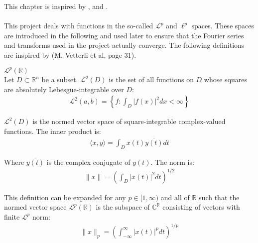 This chapter is inspired by \cite{FAA}, \cite{FSP} and \cite{FTFA}.
\\ \\
This project deals with functions in the so-called $\mathcal{L}^p$ and $\ell^p$ spaces. These spaces are introduced in the following and used later to ensure that the Fourier series and transforms used in the project actually converge. The following definitions are inspired by (M. Vetterli et al, page 31).

\begin{definition}{$\mathcal{L}^p(\mathbb{R})$}
\\
Let $D \subset \mathbb{R}^n$ be a subset. $\mathcal{L}^2(D)$ is the set of all functions on $D$ whose squares are absolutely Lebesgue-integrable over $D$:
\begin{align*}
\mathcal{L}^2(a,b) = \left\{ f: \int_D |f(x)|^2 dx < \infty \right\}
\end{align*}

$\mathcal{L}^2(D)$ is the normed vector space of square-integrable complex-valued functions. The inner product is:
\begin{align*}
\langle x,y \rangle =  \int_D x(t) \overline{y(t)} dt
\end{align*}

Where $\overline{y(t)}$ is the complex conjugate of $y(t)$. The norm is:
\begin{align*}
\|x\| = \left( \int_D |x(t)|^2 dt \right)^{1/2}
\end{align*}

This definition can be expanded for any $p \in [1,\infty)$ and all of $\mathbb{R}$ such that the normed vector space $\mathcal{L}^p(\mathbb{R})$ is the subspace of $\mathbb{C}^\mathbb{R}$ consisting of vectors with finite $\mathcal{L}^p$ norm:
\begin{align*}
\|x\|_p = \left( \int_{-\infty}^\infty |x(t)|^p dt \right)^{1/p}
\end{align*}
\end{definition}

